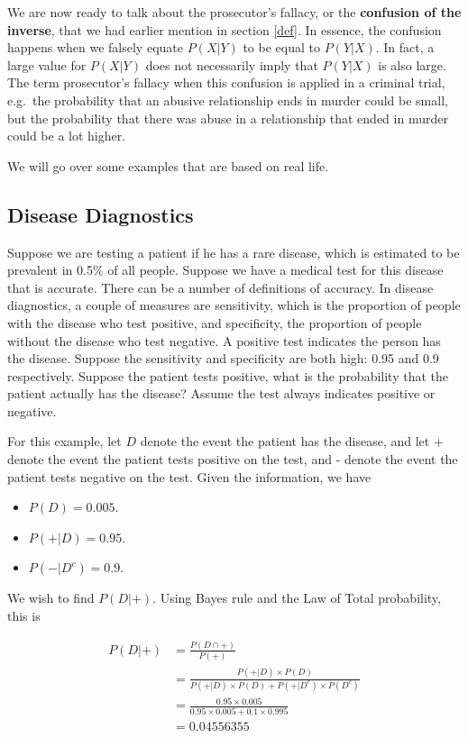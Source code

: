 \documentclass[
]{book}
\providecommand{\tightlist}{%
  \setlength{\itemsep}{0pt}\setlength{\parskip}{0pt}}
\begin{document}
We are now ready to talk about the prosecutor's fallacy, or the \textbf{confusion of the inverse}, that we had earlier mention in section \ref{def}. In essence, the confusion happens when we falsely equate \(P(X|Y)\) to be equal to \(P(Y|X)\). In fact, a large value for \(P(X|Y)\) does not necessarily imply that \(P(Y|X)\) is also large. The term prosecutor's fallacy when this confusion is applied in a criminal trial, e.g.~the probability that an abusive relationship ends in murder could be small, but the probability that there was abuse in a relationship that ended in murder could be a lot higher.

We will go over some examples that are based on real life.

\subsection{Disease Diagnostics}\label{disease-diagnostics}

Suppose we are testing a patient if he has a rare disease, which is estimated to be prevalent in 0.5\% of all people. Suppose we have a medical test for this disease that is accurate. There can be a number of definitions of accuracy. In disease diagnostics, a couple of measures are sensitivity, which is the proportion of people with the disease who test positive, and specificity, the proportion of people without the disease who test negative. A positive test indicates the person has the disease. Suppose the sensitivity and specificity are both high: 0.95 and 0.9 respectively. Suppose the patient tests positive, what is the probability that the patient actually has the disease? Assume the test always indicates positive or negative.

For this example, let \(D\) denote the event the patient has the disease, and let + denote the event the patient tests positive on the test, and - denote the event the patient tests negative on the test. Given the information, we have

\begin{itemize}
\tightlist
\item
  \(P(D) = 0.005\).
\item
  \(P(+|D) = 0.95\).
\item
  \(P(-|D^c) = 0.9\).
\end{itemize}

We wish to find \(P(D|+)\). Using Bayes rule and the Law of Total probability, this is

\[
\begin{split}
P(D|+) &= \frac{P(D \cap +)}{P(+)}\\
 &= \frac{P(+|D) \times P(D)}{P(+|D) \times P(D) + P(+|D^c) \times P(D^c)} \\
&= \frac{0.95 \times 0.005}{0.95 \times 0.005 + 0.1 \times 0.995 }\\
&= 0.04556355
\end{split}
\]
\end{document}
